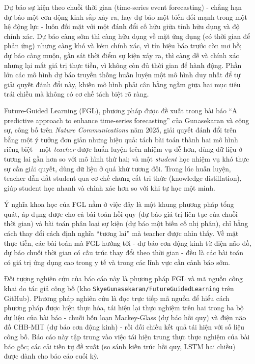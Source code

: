 
Dự báo sự kiện theo chuỗi thời gian (time-series event forecasting) - chẳng hạn dự báo một
cơn động kinh sắp xảy ra, hay dự báo một biến đổi mạnh trong một hệ động lực - luôn đối mặt
với một đánh đổi cố hữu giữa tính hữu dụng và độ chính xác. Dự báo càng sớm thì càng hữu dụng
về mặt ứng dụng (có thời gian để phản ứng) nhưng càng khó và kém chính xác, vì tín hiệu báo
trước còn mơ hồ; dự báo càng muộn, gần sát thời điểm sự kiện xảy ra, thì càng dễ và chính xác
nhưng lại mất giá trị thực tiễn, vì không còn đủ thời gian để hành động. Phần lớn các mô hình
dự báo truyền thống huấn luyện một mô hình duy nhất để tự giải quyết đánh đổi này, khiến mô
hình phải cân bằng ngầm giữa hai mục tiêu trái chiều mà không có cơ chế tách biệt rõ ràng.

Future-Guided Learning (FGL), phương pháp được đề xuất trong bài báo
``A predictive approach to enhance time-series forecasting'' của Gunasekaran và cộng sự,
công bố trên \textit{Nature Communications} năm 2025, giải quyết đánh đổi trên bằng một ý
tưởng đơn giản nhưng hiệu quả: tách bài toán thành hai mô hình riêng biệt - một
\textit{teacher} được huấn luyện trên nhiệm vụ dễ hơn, dùng dữ liệu ở tương lai gần hơn so
với mô hình thứ hai; và một \textit{student} học nhiệm vụ khó thực sự cần giải quyết, dùng dữ
liệu ở quá khứ tương đối. Trong lúc huấn luyện, teacher dẫn dắt student qua cơ chế chưng cất
tri thức (knowledge distillation), giúp student học nhanh và chính xác hơn so với khi tự học
một mình.

Ý nghĩa khoa học của FGL nằm ở việc đây là một khung phương pháp tổng quát, áp dụng được cho
cả bài toán hồi quy (dự báo giá trị liên tục của chuỗi thời gian) và bài toán phân loại sự
kiện (dự báo một biến cố nhị phân), chỉ bằng cách thay đổi cách định nghĩa ``tương lai'' mà
teacher được nhìn thấy. Về mặt thực tiễn, các bài toán mà FGL hướng tới - dự báo cơn động
kinh từ điện não đồ, dự báo chuỗi thời gian có cấu trúc thay đổi theo thời gian - đều là các
bài toán có giá trị ứng dụng cao trong y tế và trong các lĩnh vực cần cảnh báo sớm.

Đối tượng nghiên cứu của báo cáo này là phương pháp FGL và mã nguồn công khai do tác giả công
bố (kho \texttt{SkyeGunasekaran/FutureGuidedLearning} trên GitHub). Phương pháp nghiên cứu là
đọc trực tiếp mã nguồn để hiểu cách phương pháp được hiện thực hóa, tái hiện lại thực nghiệm
trên hai trong ba bộ dữ liệu của bài báo - chuỗi hỗn loạn Mackey-Glass (dự báo hồi quy) và
điện não đồ CHB-MIT (dự báo cơn động kinh) - rồi đối chiếu kết quả tái hiện với số liệu công
bố. Báo cáo này tập trung vào việc tái hiện trung thực thực nghiệm của bài báo gốc; các cải
tiến tự đề xuất (so sánh kiến trúc hồi quy, LSTM hai chiều) được dành cho báo cáo cuối kỳ.

